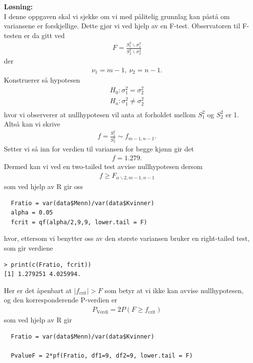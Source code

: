 \documentclass[12pt,
               a4paper,
               article,
               oneside,
               oldfontcommands,
               norsk]{memoir}
\begin{document}
\textbf{Løsning:}\vspace{4mm}\\ 
I denne oppgaven skal vi sjekke om vi med pålitelig grunnlag kan påstå om variansene er forskjellige. Dette gjør vi ved hjelp av en F-test. Observatoren til F-testen er da gitt ved 
\begin{align*}
  F = \frac{S_{1}^2 \backslash \sigma_{1}^{2}}{S_{2}^2 \backslash\sigma_{2}^{2}}
\end{align*}
der 
\begin{align*}
  \nu_{1} = m - 1, \ \nu_{2} = n-1.
\end{align*}
Konstruerer så hypotesen
\begin{align*}
  H_{0}: \sigma_{1}^{2} = \sigma_{2}^{2} \\[5pt]
  H_{a}: \sigma_{1}^{2} \neq \sigma_{2}^{2} \\[5pt]
\end{align*}
hvor vi observerer at nullhypotesen vil anta at forholdet mellom $S_{1}^2$ og $S_{2}^2$ er 1. Altså kan vi skrive 
\begin{align*}
  f = \frac{S_{1}^2}{S_{2}^2} \sim f_{m-1, n-1}.
\end{align*}
Setter vi så inn for verdien til variansen for begge kjønn gir det 
\begin{align*}
  f = 1.279.
\end{align*}
Dermed kan vi ved en two-tailed test avvise nullhypotesen dersom 
\begin{align*}
  f \geq F_{\alpha \backslash 2, m - 1, n -1}
\end{align*}
som ved hjelp av R gir oss 
\begin{lstlisting}
  Fratio = var(data$Menn)/var(data$Kvinner)
  alpha = 0.05
  fcrit = qf(alpha/2,9,9, lower.tail = F)
\end{lstlisting}
hvor, ettersom vi benytter oss av den største variansen bruker en right-tailed test, som gir verdiene
\begin{verbatim} 
> print(c(Fratio, fcrit))
[1] 1.279251 4.025994.
\end{verbatim}
Her er det åpenbart at $|f_{\text{crit}}| > F$ som betyr at vi ikke kan avvise nullhypotesen, og den korresponderende P-verdien er 
\begin{align*}
  P_{\text{Verdi}} = 2P(F \geq f_{\text{crit}})
\end{align*}
som ved hjelp av R gir 
\begin{lstlisting}
  Fratio = var(data$Menn)/var(data$Kvinner)

  PvalueF = 2*pf(Fratio, df1=9, df2=9, lower.tail = F)
\end{lstlisting}
\end{document}
